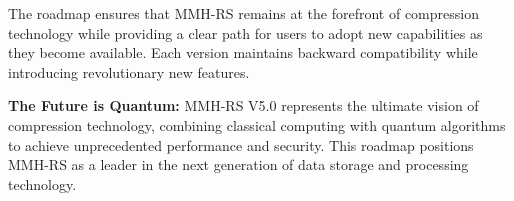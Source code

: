 \documentclass[12pt,a4paper]{article}
\begin{document}
The roadmap ensures that MMH-RS remains at the forefront of compression technology while providing a clear path for users to adopt new capabilities as they become available. Each version maintains backward compatibility while introducing revolutionary new features.

\textbf{The Future is Quantum:}
MMH-RS V5.0 represents the ultimate vision of compression technology, combining classical computing with quantum algorithms to achieve unprecedented performance and security. This roadmap positions MMH-RS as a leader in the next generation of data storage and processing technology.
\end{document}
